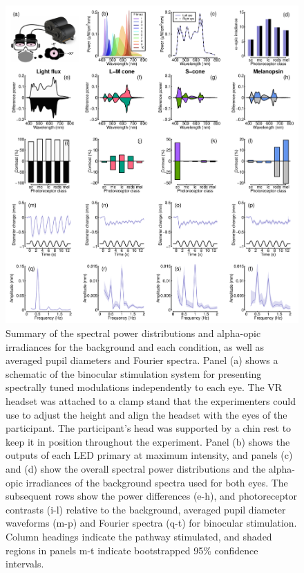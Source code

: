\documentclass[
]{article}
\begin{document}
\begin{figure}

{\centering \includegraphics[width=0.8\linewidth]{Figures/methodsfigrods} 

}

\caption{Summary of the spectral power distributions and alpha-opic irradiances for the background and each condition, as well as averaged pupil diameters and Fourier spectra. Panel (a) shows a schematic of the binocular stimulation system for presenting spectrally tuned modulations independently to each eye. The VR headset was attached to a clamp stand that the experimenters could use to adjust the height and align the headset with the eyes of the participant. The participant's head was supported by a chin rest to keep it in position throughout the experiment. Panel (b) shows the outputs of each LED primary at maximum intensity, and panels (c) and (d) show the overall spectral power distributions and the alpha-opic irradiances of the background spectra used for both eyes. The subsequent rows show the power differences (e-h), and photoreceptor contrasts (i-l) relative to the background, averaged pupil diameter waveforms (m-p) and Fourier spectra (q-t) for binocular stimulation. Column headings indicate the pathway stimulated, and shaded regions in panels m-t indicate bootstrapped 95\% confidence intervals.}\label{fig:spectraplots}
\end{figure}
\end{document}
